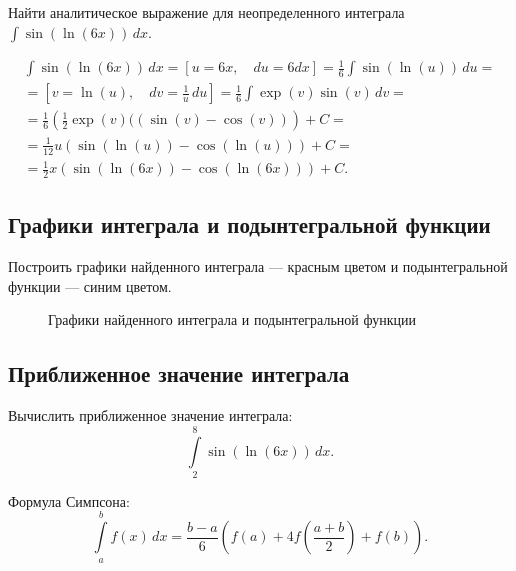 \documentclass[10pt, a4paper, titlepage]{article}
\begin{document}
Найти аналитическое выражение для неопределенного интеграла $\int \sin(\ln(6x))\,dx$.

\begin{multline*}
\int\sin(\ln(6x))\,dx =
\left[u=6x, \quad du=6dx\right] =
\frac{1}{6}\int\sin(\ln(u))\,du = \\ =
\left[v=\ln(u), \quad dv=\frac{1}{u}\,du\right] =
\frac{1}{6}\int\exp(v)\sin(v)\,dv = \\ =
\frac{1}{6}\left(\frac{1}{2}\exp(v)((\sin(v)-\cos(v))\right)+C = \\ =
\frac{1}{12}u(\sin(\ln(u))-\cos(\ln(u)))+C = \\ =
\frac{1}{2}x(\sin(\ln(6x))-\cos(\ln(6x)))+C.
\end{multline*}

\subsection*{Графики интеграла и подынтегральной функции}

Построить графики найденного интеграла --- красным цветом и подынтегральной функции --- синим цветом.

\begin{figure}[H]
    \centering
    \caption{Графики найденного интеграла и подынтегральной функции}
\end{figure}


\subsection*{Приближенное значение интеграла}

Вычислить приближенное значение интеграла: $$\int\limits_2^{8} \sin(\ln(6x))\,dx .$$

Формула Симпсона:
$$\int\limits_a^b f(x) \, dx = \frac{b-a}{6}\left(f(a)+4f\left(\frac{a+b}{2}\right)+f(b)\right) .$$
\end{document}
